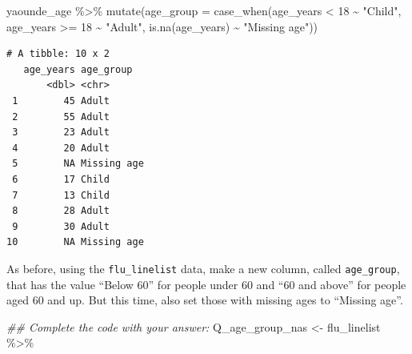 \documentclass[
  letterpaper,
  DIV=11,
  numbers=noendperiod]{scrreprt}
\newenvironment{Shaded}{\begin{snugshade}}{\end{snugshade}}
\newcommand{\AttributeTok}[1]{\textcolor[rgb]{0.40,0.45,0.13}{#1}}
\newcommand{\DecValTok}[1]{\textcolor[rgb]{0.68,0.00,0.00}{#1}}
\newcommand{\DocumentationTok}[1]{\textcolor[rgb]{0.37,0.37,0.37}{\textit{#1}}}
\newcommand{\FunctionTok}[1]{\textcolor[rgb]{0.28,0.35,0.67}{#1}}
\newcommand{\NormalTok}[1]{\textcolor[rgb]{0.00,0.23,0.31}{#1}}
\newcommand{\OtherTok}[1]{\textcolor[rgb]{0.00,0.23,0.31}{#1}}
\newcommand{\SpecialCharTok}[1]{\textcolor[rgb]{0.37,0.37,0.37}{#1}}
\newcommand{\StringTok}[1]{\textcolor[rgb]{0.13,0.47,0.30}{#1}}
\begin{document}
\begin{Shaded}
\begin{Highlighting}[]
\NormalTok{yaounde\_age }\SpecialCharTok{\%\textgreater{}\%}  
  \FunctionTok{mutate}\NormalTok{(}\AttributeTok{age\_group =} \FunctionTok{case\_when}\NormalTok{(age\_years }\SpecialCharTok{\textless{}} \DecValTok{18} \SpecialCharTok{\textasciitilde{}} \StringTok{"Child"}\NormalTok{, }
\NormalTok{                               age\_years }\SpecialCharTok{\textgreater{}=} \DecValTok{18} \SpecialCharTok{\textasciitilde{}} \StringTok{"Adult"}\NormalTok{, }
                               \FunctionTok{is.na}\NormalTok{(age\_years) }\SpecialCharTok{\textasciitilde{}} \StringTok{"Missing age"}\NormalTok{))}
\end{Highlighting}
\end{Shaded}

\begin{verbatim}
# A tibble: 10 x 2
   age_years age_group  
       <dbl> <chr>      
 1        45 Adult      
 2        55 Adult      
 3        23 Adult      
 4        20 Adult      
 5        NA Missing age
 6        17 Child      
 7        13 Child      
 8        28 Adult      
 9        30 Adult      
10        NA Missing age
\end{verbatim}

\begin{tcolorbox}[enhanced jigsaw, titlerule=0mm, colback=white, left=2mm, breakable, opacitybacktitle=0.6, colbacktitle=quarto-callout-tip-color!10!white, colframe=quarto-callout-tip-color-frame, bottomtitle=1mm, opacityback=0, coltitle=black, arc=.35mm, toptitle=1mm, title=\textcolor{quarto-callout-tip-color}{\faLightbulb}\hspace{0.5em}{Practice}, leftrule=.75mm, toprule=.15mm, bottomrule=.15mm, rightrule=.15mm]

As before, using the \texttt{flu\_linelist} data, make a new column,
called \texttt{age\_group}, that has the value ``Below 60'' for people
under 60 and ``60 and above'' for people aged 60 and up. But this time,
also set those with missing ages to ``Missing age''.

\begin{Shaded}
\begin{Highlighting}[]
\DocumentationTok{\#\# Complete the code with your answer:}
\NormalTok{Q\_age\_group\_nas }\OtherTok{\textless{}{-}} 
\NormalTok{  flu\_linelist }\SpecialCharTok{\%\textgreater{}\%} 
\end{Highlighting}
\end{Shaded}

\end{tcolorbox}
\end{document}
